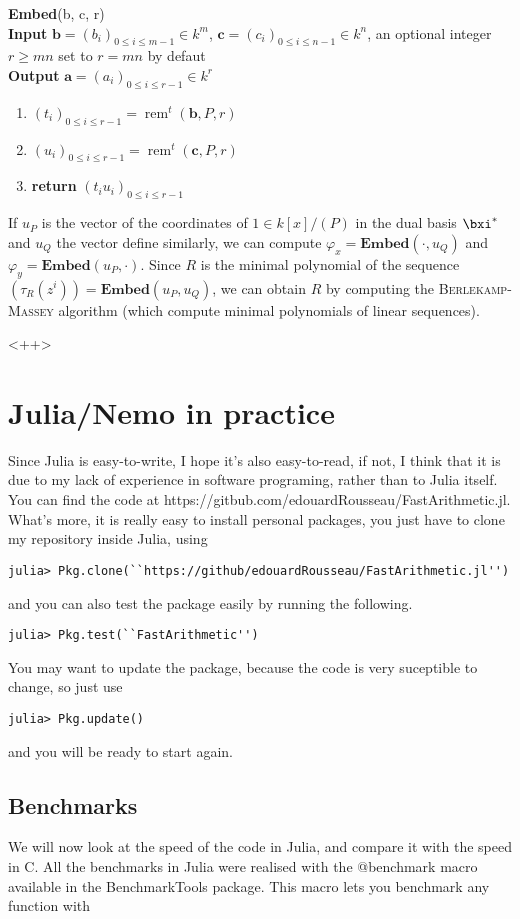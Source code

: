 \documentclass[a4paper,11pt]{article}
\theoremstyle{break}
\theoremstyle{definition}
\theoremstyle{remark}
\DeclareMathOperator{\rem}{rem}
\newcommand{\remt}{\rem^t}
\begin{document}
\textbf{Embed}(b, c, r)\\
\textbf{Input} $\textbf{b}=(b_i)_{0\leq i\leq m-1}\in k^m$,
$\textbf{c}=(c_i)_{0\leq i\leq n-1}\in k^n$, an optional integer $r\geq mn$ set
to $r=mn$ by defaut\\
\textbf{Output} $\textbf{a}=(a_i)_{0\leq i\leq r-1}\in k^r$
\begin{enumerate}
  \item $(t_i)_{0\leq i \leq r-1}=\remt(\textbf{b},P,r)$
  \item $(u_i)_{0\leq i \leq r-1}=\remt(\textbf{c},P,r)$
  \item \textbf{return} $(t_iu_i)_{0\leq i \leq r-1}$
\end{enumerate}
If $u_P$ is the vector of the coordinates of $1\in k[x]/(P)$ in the dual basis
$\bxi^*$ and $u_Q$ the vector define similarly, we can compute
$\varphi_x=\textbf{Embed}(\cdot,u_Q)$ and $\varphi_y=\textbf{Embed}(u_P,\cdot)$.
Since $R$ is the minimal polynomial of the sequence
$(\tau_R(z^i))=\textbf{Embed}(u_P,u_Q)$, we can obtain $R$ by computing the
\textsc{Berlekamp-Massey} algorithm (which compute minimal polynomials of linear
sequences).

<++>

\section{Julia/Nemo in practice}
Since Julia is easy-to-write, I hope it's also
easy-to-read, if not, I think that it is due to my lack of experience in
software programing, rather than to Julia itself. You can find the code
at
https://gitbub.com/edouardRousseau/FastArithmetic.jl. What's more, it is really
easy to install personal packages, you just have to clone my repository
inside Julia, using
\begin{verbatim}
julia> Pkg.clone(``https://github/edouardRousseau/FastArithmetic.jl'') 
\end{verbatim}
and you can also test the package easily by running the following.
\begin{verbatim}
julia> Pkg.test(``FastArithmetic'') 
\end{verbatim}
You may want to update the package, because the code is very suceptible to 
change, so just use
\begin{verbatim}
julia> Pkg.update()
\end{verbatim}
and you will be ready to start again. 
\subsection{Benchmarks}
We will now look at the speed of the code in Julia, and compare it with
the speed in C. All the benchmarks in Julia were realised with the
@benchmark macro available in the BenchmarkTools package. This macro lets you
benchmark any function with 
\end{document}
